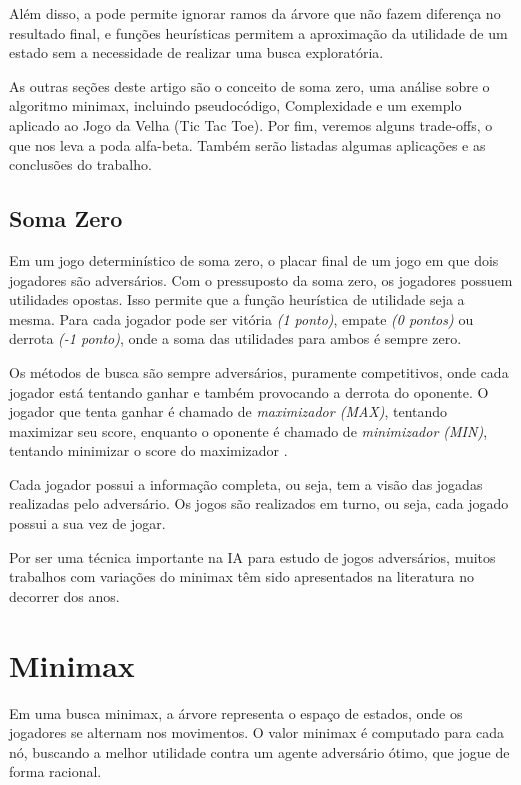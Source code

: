 \documentclass[sigplan,screen]{acmart}
\begin{document}
Além disso, a pode permite ignorar ramos da árvore que não fazem diferença no resultado final, e funções heurísticas permitem a aproximação da utilidade de um estado sem a necessidade de realizar uma busca exploratória.

As outras seções deste artigo são o conceito de soma zero, uma análise sobre o algoritmo minimax, incluindo pseudocódigo, Complexidade e um exemplo aplicado ao Jogo da Velha (Tic Tac Toe). 
Por fim, veremos alguns trade-offs, o que nos leva a poda alfa-beta. Também serão listadas algumas aplicações e as conclusões do trabalho.

\subsection{Soma Zero}
Em um jogo determinístico de soma zero, o placar final de um jogo em que dois jogadores são adversários.
Com o pressuposto da soma zero, os jogadores possuem utilidades opostas. Isso permite que a função heurística de utilidade seja a mesma.
Para cada jogador pode ser vitória {\itshape(1 ponto)}, empate {\itshape(0 pontos)} ou derrota {\itshape(-1 ponto)}, onde a soma das utilidades para ambos é sempre zero.

Os métodos de busca são sempre adversários, puramente competitivos, onde cada jogador está tentando ganhar e também provocando a derrota do oponente. 
O jogador que tenta ganhar é chamado de {\itshape maximizador (MAX)}, tentando maximizar seu score, enquanto o oponente é chamado de {\itshape minimizador (MIN)}, tentando minimizar o score do maximizador \cite{Aradhya01}.

Cada jogador possui a informação completa, ou seja, tem a visão das jogadas realizadas pelo adversário. Os jogos são realizados em turno, ou seja, cada jogado possui a sua vez de jogar.

Por ser uma técnica importante na IA para estudo de jogos adversários, muitos trabalhos com variações do minimax têm sido apresentados na literatura \cite{Diderich93} no decorrer dos anos.

\section{Minimax}
Em uma busca minimax, a árvore representa o espaço de estados, onde os jogadores se alternam nos movimentos. O valor minimax é computado para cada nó, buscando a melhor utilidade contra um agente adversário ótimo, que jogue de forma racional.
\end{document}
